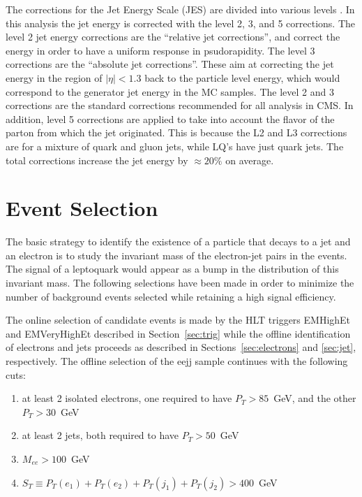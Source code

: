 \documentclass{cmspaper}
\begin{document}
\begin{linenumbers}
The corrections for the Jet Energy Scale (JES) are divided into various levels \cite{JES}.  
In this analysis the jet energy is corrected with the level 2, 3, and 5 corrections.  
The level 2 jet energy corrections are the 
``relative jet corrections'', and correct the energy in order to have a uniform response in psudorapidity.  
The level 3 corrections are the ``absolute jet corrections''.  These aim at correcting the jet energy in the 
region of $|\eta| < 1.3$ back to the particle level energy, which would correspond to the generator jet energy in the MC samples. 
The level 2 and 3 corrections are the standard corrections recommended for all analysis in CMS. 
In addition, level 5 corrections are applied to take into account the flavor of the parton from which the jet originated.
This is because the L2 and L3 corrections are for a mixture of quark and gluon jets, while LQ's 
have just quark jets. The total corrections increase the jet energy by $\approx 20\%$ on average.


\section{Event Selection} \label{sec:eventSelection}
The basic strategy to identify the existence of a particle that decays to a jet and an electron 
is to study the invariant mass of the electron-jet pairs in the events. 
The signal of a leptoquark would appear as a bump in the distribution of this invariant mass.
The following selections have been made in order to minimize the number of background events 
selected while retaining a high signal efficiency.

The online selection of candidate events is made by the HLT triggers EMHighEt and EMVeryHighEt 
described in Section~\ref{sec:trig} while the offline identification of electrons and jets 
proceeds as described in Sections~\ref{sec:electrons} and \ref{sec:jet}, respectively.
The offline selection of the eejj sample continues with the following cuts:

\begin{enumerate}
\item at least 2 isolated electrons, one required to have $P_T>85$~GeV, 
and the other $P_T>30$~GeV 
\item at least 2 jets, both required to have $P_T>50$~GeV
\item $M_{ee}>100$~GeV
\item $S_T\equiv P_T(e_1)+P_T(e_2)+P_T(j_1)+P_T(j_2)>400$~GeV
\end{enumerate}


\end{linenumbers}
\end{document}
